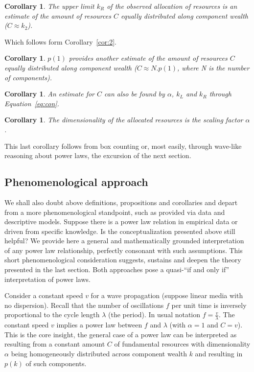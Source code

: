 \documentclass[a4paper, 11pt]{article} %
\newtheorem{corollary}[theorem2]{Corollary}
\begin{document}
\begin{corollary}
	The upper limit $k_R$ of the observed allocation of resources is an estimate of the amount of resources $C$ equally distributed along component wealth ($C\approx k_2$).
\end{corollary}

Which follows form Corollary~\ref{cor:2}.

\begin{corollary}
	$p(1)$ provides another estimate of the amount of resources $C$ equally distributed along component wealth ($C\approx N . p(1)$, where N is the number of components).
\end{corollary}

\begin{corollary}
	An estimate for $C$ can also be found by $\alpha$, $k_L$ and $k_R$ through Equation~\ref{eq:con}.
\end{corollary}

\begin{corollary}
	The dimensionality of the allocated resources is the scaling factor $\alpha$.
\end{corollary}

This last corollary follows from box counting or, most easily,
through wave-like reasoning about power laws,
the excursion of the next section.

\subsection{Phenomenological approach}\label{sec:phen}

We shall also
doubt above definitions, propositions and corollaries 
and depart from a more phenomenological standpoint,
such as provided via data and descriptive models.
Suppose there is a power law relation in empirical data
or driven from specific knowledge.
Is the conceptualization
presented above still helpful?
We provide here a general and mathematically grounded
interpretation of any power law relationship,
perfectly consonant with such assumptions.
This short phenomenological consideration
suggests, sustains and deepen the theory presented in the last section.
Both approaches pose a quasi-``if and only if''
interpretation of power laws.

Consider a constant speed $v$ for a wave propagation
(suppose linear media with no dispersion).
Recall that the number of oscillations $f$ per unit time is
inversely proportional to the cycle length $\lambda$ (the period).
In usual notation $f=\frac{v}{\lambda}$.
The constant speed $v$ implies a power law between 
$f$ and $\lambda$ (with $\alpha=1$ and $C=v$).
This is the core insight, the general case of a power law can
be interpreted as resulting from a constant amount $C$ of
fundamental resources with dimensionality $\alpha$ 
being homogeneously distributed across
component wealth $k$ and 
resulting in $p(k)$ of such components.
\end{document}
